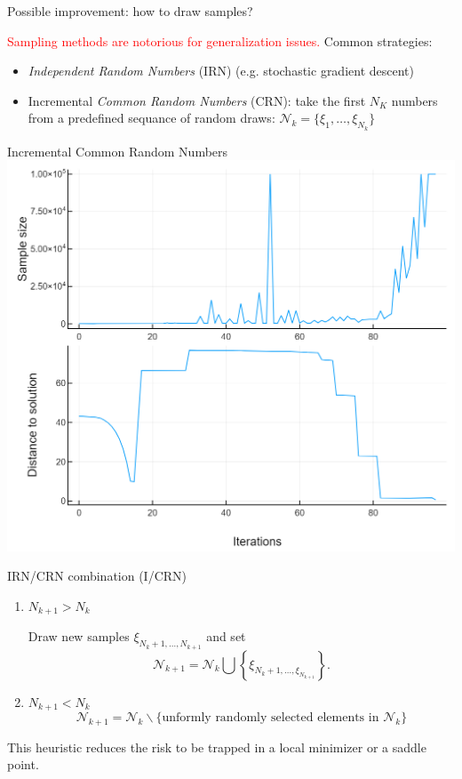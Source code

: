 \documentclass{beamer}
\begin{document}
\begin{frame}{Possible improvement: how to draw samples?}
	
	\textcolor{red}{Sampling methods are notorious for generalization issues.}
	Common strategies:
	\begin{itemize}
		\item \textit{Independent Random Numbers} (IRN) (e.g. stochastic gradient descent)
		\item Incremental \textit{Common Random Numbers} (CRN): take the first $N_K$ numbers from a predefined sequance of random draws: $\mathcal{N}_k = \{ \xi_1, \ldots, \xi_{N_k} \}$
	\end{itemize}
	
\end{frame}

\begin{frame}{Incremental Common Random Numbers}    
	\centering
	\includegraphics[scale=0.5]{DistTo_sampleSize_CRN.PNG}
\end{frame}

\begin{frame}{IRN/CRN combination (I/CRN)}
	
	\begin{enumerate}
		\item $N_{k+1} > N_k$
		
		Draw new samples $\xi_{N_{k}+1,\ldots,N_{k+1}}$ and set
		$$
		\mathcal{N}_{k+1} = \mathcal{N}_k \bigcup \left\{ \xi_{N_{k}+1,\ldots,\xi_{N_{k+1}}} \right\}.
		$$
		
		\item $N_{k+1} < N_k$
		$$\mathcal{N}_{k+1} = \mathcal{N}_k \backslash  \{\text{unformly randomly selected elements in } \mathcal{N}_k\}$$
	\end{enumerate}
	
	This heuristic reduces the risk to be trapped in a local minimizer or a saddle point.
	
\end{frame}
\end{document}

